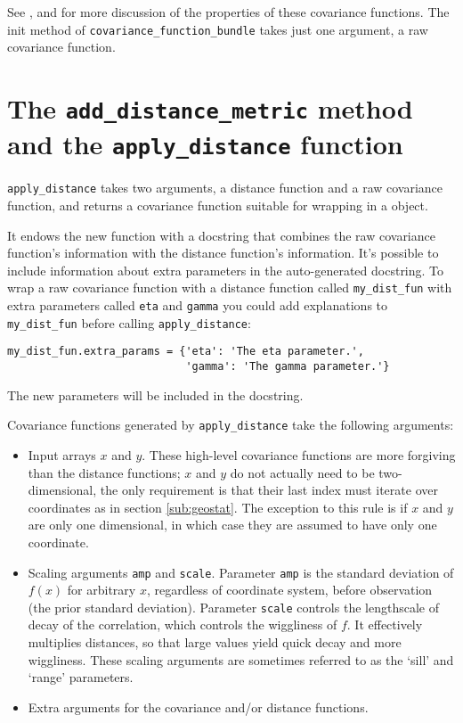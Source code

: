 See  \cite{banerjee} ,  \cite{diggle} and  \cite{stein}for more discussion of the properties of these covariance functions. The init method of \texttt{covariance_function_bundle} takes just one argument, a raw covariance function.

\section{The \texttt{add_distance_metric} method and the \texttt{apply_distance} function}\label{sub:add_distance_metric}
\texttt{apply_distance} takes two arguments, a distance function and a raw covariance function, and returns a covariance function suitable for wrapping in a  object.

It endows the new function with a docstring that combines the raw covariance function's information with the distance function's information. It's possible to include information about extra parameters in the auto-generated docstring. To wrap a raw covariance function with a distance function called \texttt{my_dist_fun} with extra parameters called \texttt{eta} and \texttt{gamma} you could add explanations to \texttt{my_dist_fun} before calling \texttt{apply_distance}:
\begin{verbatim}
my_dist_fun.extra_params = {'eta': 'The eta parameter.',
                            'gamma': 'The gamma parameter.'}
\end{verbatim}
The new parameters will be included in the docstring.

Covariance functions generated by \texttt{apply_distance} take the following arguments:
\begin{itemize}
    \item Input arrays $x$ and $y$. These high-level covariance functions are more forgiving than the distance functions; $x$ and $y$ do not actually need to be two-dimensional, the only requirement is that their last index must iterate over coordinates as in section \ref{sub:geostat}. The exception to this rule is if $x$ and $y$ are only one dimensional, in which case they are assumed to have only one coordinate.
    \item Scaling arguments \texttt{amp} and \texttt{scale}. Parameter \texttt{amp} is the standard deviation of $f(x)$ for arbitrary $x$, regardless of coordinate system, before observation (the prior standard deviation). Parameter \texttt{scale} controls the lengthscale of decay of the correlation, which controls the wiggliness of $f$. It effectively multiplies distances, so that large values yield quick decay and more wiggliness. These scaling arguments are sometimes referred to as the `sill' and `range' parameters.
    \item Extra arguments for the covariance and/or distance functions.
\end{itemize}

